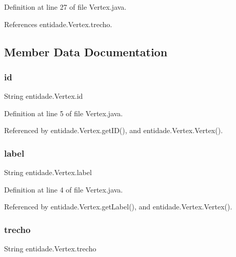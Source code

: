 Definition at line 27 of file Vertex.\+java.



References entidade.\+Vertex.\+trecho.



\subsection{Member Data Documentation}
\hypertarget{classentidade_1_1Vertex_a39a2b03733748fe6bd89bbb253dddc2b}{}\label{classentidade_1_1Vertex_a39a2b03733748fe6bd89bbb253dddc2b} 
\subsubsection{\texorpdfstring{id}{id}}
{\footnotesize\ttfamily String entidade.\+Vertex.\+id\hspace{0.3cm}{\ttfamily [private]}}



Definition at line 5 of file Vertex.\+java.



Referenced by entidade.\+Vertex.\+get\+I\+D(), and entidade.\+Vertex.\+Vertex().

\hypertarget{classentidade_1_1Vertex_a86c6f2ce5703dc144ec54026caaed1ea}{}\label{classentidade_1_1Vertex_a86c6f2ce5703dc144ec54026caaed1ea} 
\subsubsection{\texorpdfstring{label}{label}}
{\footnotesize\ttfamily String entidade.\+Vertex.\+label\hspace{0.3cm}{\ttfamily [private]}}



Definition at line 4 of file Vertex.\+java.



Referenced by entidade.\+Vertex.\+get\+Label(), and entidade.\+Vertex.\+Vertex().

\hypertarget{classentidade_1_1Vertex_af58a487a697cce6ba2e454501fb312af}{}\label{classentidade_1_1Vertex_af58a487a697cce6ba2e454501fb312af} 
\subsubsection{\texorpdfstring{trecho}{trecho}}
{\footnotesize\ttfamily String entidade.\+Vertex.\+trecho\hspace{0.3cm}{\ttfamily [private]}}



